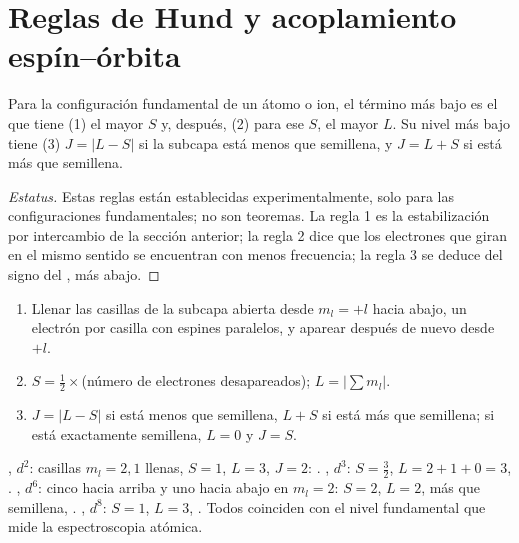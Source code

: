 \section{Reglas de Hund y acoplamiento espín--órbita}

\begin{proposition}\label{prop:b3:many-electron-atoms:hund-terms}
Para la configuración fundamental de un átomo o ion, el término más bajo es el que tiene
(1) el mayor $S$ y, después, (2) para ese $S$, el mayor $L$. Su nivel más bajo
tiene (3) $J = |L - S|$ si la subcapa está menos que semillena, y $J = L +
S$ si está más que semillena.
\end{proposition}
\begin{proof}[Estatus]
Estas reglas están establecidas experimentalmente, solo para las configuraciones fundamentales;
no son teoremas. La regla 1 es la estabilización por intercambio de la sección
anterior; la regla 2 dice que los electrones que giran en el mismo sentido se encuentran
con menos frecuencia; la regla 3 se deduce del signo del , más abajo.
\end{proof}

\begin{method}\label{met:b3:many-electron-atoms:ground-term}
\begin{enumerate}
  \item Llenar las casillas de la subcapa abierta desde $m_l = +l$ hacia abajo, un
        electrón por casilla con espines paralelos, y aparear después de nuevo desde $+l$.
  \item $S = \frac12 \times$(número de electrones desapareados); $L = |\sum m_l|$.
  \item $J = |L - S|$ si está menos que semillena, $L + S$ si está más que
        semillena; si está exactamente semillena, $L = 0$ y $J = S$.
\end{enumerate}
\end{method}

\begin{example}\label{ex:b3:many-electron-atoms:ground-terms}
, $d^2$: casillas $m_l = 2, 1$ llenas, $S = 1$, $L = 3$, $J = 2$:
. , $d^3$: $S = \frac32$, $L = 2 + 1 + 0 = 3$,
. , $d^6$: cinco hacia arriba y uno hacia abajo en $m_l = 2$:
$S = 2$, $L = 2$, más que semillena, . , $d^8$:
$S = 1$, $L = 3$, . Todos coinciden con el nivel fundamental que
mide la espectroscopia atómica.
\end{example}

